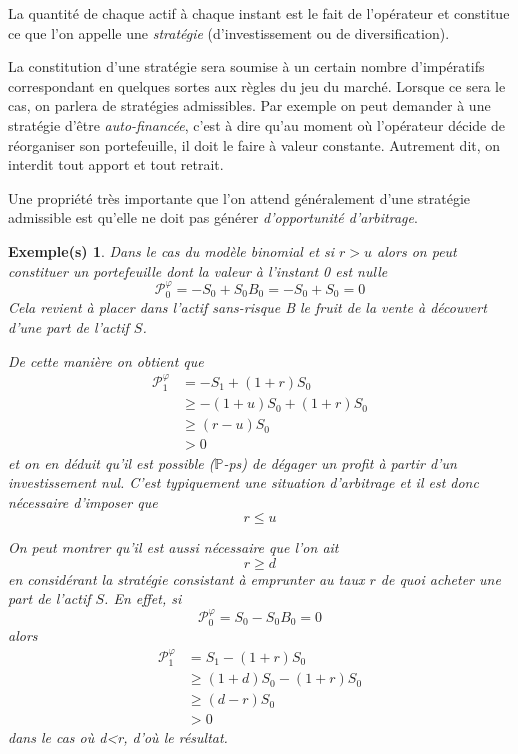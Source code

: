 \documentclass[a4paper]{book}
\newtheorem{ex}{Exemple(s)}[chapter]
\begin{document}
La quantité de chaque actif à chaque instant est le fait de l'opérateur et constitue ce que l'on appelle une \emph{stratégie} (d'investissement ou de diversification).

La constitution d'une stratégie sera soumise à un certain nombre d'impératifs correspondant en quelques sortes aux règles du jeu du marché. Lorsque ce sera le cas, on parlera de stratégies admissibles. Par exemple on peut demander à une stratégie d'être \emph{auto-financée}, c'est à dire qu'au moment où l'opérateur décide de réorganiser son portefeuille, il doit le faire à valeur constante. Autrement dit, on interdit tout apport et tout retrait.

Une propriété très importante que l'on attend généralement d'une stratégie admissible est qu'elle ne doit pas générer \emph{d'opportunité d'arbitrage}.

\begin{ex}
    Dans le cas du modèle binomial et si $r>u$ alors on peut constituer un portefeuille dont la valeur à l'instant 0 est nulle
    \[\mathcal{P}^\varphi_0=-S_0+S_0 B_0=-S_0+S_0=0 \]
    Cela revient à placer dans l'actif sans-risque B le fruit de la vente à découvert d'une part de l'actif $S$.

    De cette manière on obtient que
    \begin{align*}
        \mathcal{P}^\varphi_1 & = -S_1+(1+r)S_0         \\
                              & \geq -(1+u)S_0+(1+r)S_0 \\
                              & \geq(r-u)S_0            \\
                              & >0
    \end{align*}
    et on en déduit qu'il est possible ($\mathbb{P}$-ps) de dégager un profit à partir d'un investissement nul. C'est typiquement une situation d'arbitrage et il est donc nécessaire d'imposer que
    \[r\leq u\]

    On peut montrer qu'il est aussi nécessaire que l'on ait
    \[r\geq d\]
    en considérant la stratégie consistant à emprunter au taux $r$ de quoi acheter une part de l'actif $S$. En effet, si
    \[\mathcal{P}^\varphi_0=S_0-S_0 B_0=0 \]
    alors
    \begin{align*}
        \mathcal{P}^\varphi_1 & = S_1-(1+r)S_0         \\
                              & \geq (1+d)S_0-(1+r)S_0 \\
                              & \geq(d-r)S_0           \\
                              & >0
    \end{align*}
    dans le cas où d<r, d'où le résultat.
\end{ex}
\end{document}

